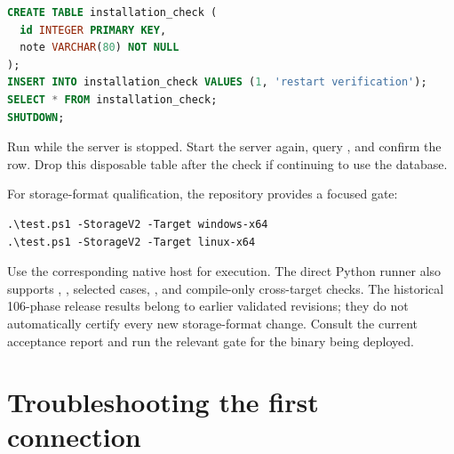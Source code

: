 \begin{lstlisting}[language=SQL]
CREATE TABLE installation_check (
  id INTEGER PRIMARY KEY,
  note VARCHAR(80) NOT NULL
);
INSERT INTO installation_check VALUES (1, 'restart verification');
SELECT * FROM installation_check;
SHUTDOWN;
\end{lstlisting}

Run  while the server is stopped. Start
the server again, query , and confirm the row.
Drop this disposable table after the check if continuing to use the database.

For storage-format qualification, the repository provides a focused gate:

\begin{lstlisting}
.\test.ps1 -StorageV2 -Target windows-x64
.\test.ps1 -StorageV2 -Target linux-x64
\end{lstlisting}

Use the corresponding native host for execution. The direct Python runner
also supports , , selected cases,
, and compile-only cross-target checks. The historical
106-phase release results belong to earlier validated revisions; they do not
automatically certify every new storage-format change. Consult the current
acceptance report and run the relevant gate for the binary being deployed.


\section{Troubleshooting the first connection}

